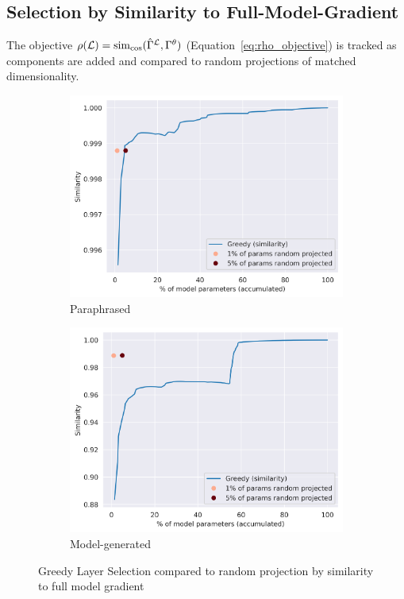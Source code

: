 \subsection{Selection by Similarity to Full-Model-Gradient}
The objective $\rho(\mathcal{L})=\operatorname{sim}_{\cos}(\hat{\Gamma}^{\mathcal{L}},\Gamma^\theta)$ (Equation~\ref{eq:rho_objective}) is tracked as components are added and compared to random projections of matched dimensionality.
\begin{figure}[h]
    \centering
    \begin{subfigure}[b]{0.49\textwidth}
        \centering
        \includegraphics[width=\textwidth]{figures/results/paraphrased/greedy_layer_selection.png}
        \caption{Paraphrased}
        \label{fig:greedy_layer_selection_paraphrased}
    \end{subfigure}
    \hfill
    \begin{subfigure}[b]{0.49\textwidth}
        \centering
        \includegraphics[width=\textwidth]{figures/results/model-generated/greedy_layer_selection.png}
        \caption{Model-generated}
        \label{fig:greedy_layer_selection_model_generated}
    \end{subfigure}
    \caption{Greedy Layer Selection compared to random projection by similarity to full model gradient}
    \label{fig:greedy_layer_selection}
\end{figure}

